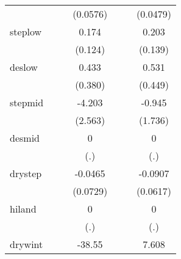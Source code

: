 {\begin{tabular}{l*{6}{c}}
            &                     &                     &    (0.0576)         &                     &                     &    (0.0479)         \\
[1em]
steplow     &                     &                     &       0.174         &                     &                     &       0.203         \\
            &                     &                     &     (0.124)         &                     &                     &     (0.139)         \\
[1em]
deslow      &                     &                     &       0.433         &                     &                     &       0.531         \\
            &                     &                     &     (0.380)         &                     &                     &     (0.449)         \\
[1em]
stepmid     &                     &                     &      -4.203         &                     &                     &      -0.945         \\
            &                     &                     &     (2.563)         &                     &                     &     (1.736)         \\
[1em]
desmid      &                     &                     &           0         &                     &                     &           0         \\
            &                     &                     &         (.)         &                     &                     &         (.)         \\
[1em]
drystep     &                     &                     &     -0.0465         &                     &                     &     -0.0907         \\
            &                     &                     &    (0.0729)         &                     &                     &    (0.0617)         \\
[1em]
hiland      &                     &                     &           0         &                     &                     &           0         \\
            &                     &                     &         (.)         &                     &                     &         (.)         \\
[1em]
drywint     &                     &                     &      -38.55         &                     &                     &       7.608         \\

\end{tabular}}
